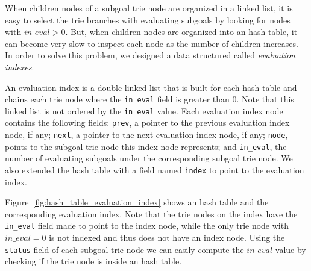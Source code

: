 When children nodes of a subgoal trie node are organized in a linked list, it is
easy to select the trie branches with evaluating subgoals by looking for nodes
with $in\_eval > 0$. But, when children nodes are organized into an hash table, it
can become very slow to inspect each node as the number of children increases.
In order to solve this problem, we designed a data structured called \textit{evaluation
indexes}.

An evaluation index is a double linked list that is built for each hash table and
chains each trie node where the \texttt{in\_eval} field is greater than 0. Note that
this linked list is not ordered by the \texttt{in\_eval} value. Each evaluation index
node contains the following fields: \texttt{prev}, a pointer to the previous evaluation
index node, if any; \texttt{next}, a pointer to the next evaluation index node, if any;
\texttt{node}, points to the subgoal trie node this index node represents; and
\texttt{in\_eval}, the number of evaluating subgoals under the corresponding subgoal trie node.
We also extended the hash table with a field named \texttt{index} to point to the evaluation
index.

Figure~\ref{fig:hash_table_evaluation_index} shows an hash table and the corresponding
evaluation index. Note that the trie nodes on the index have the \texttt{in\_eval} field
made to point to the index node, while the only trie node with $in\_eval = 0$ is not indexed
and thus does not have an index node. Using the \texttt{status} field of each subgoal trie node
we can easily compute the $in\_eval$ value by checking if the trie node is inside an
hash table.


